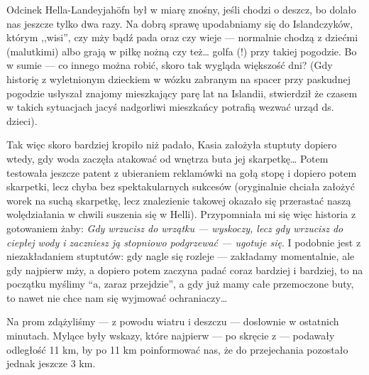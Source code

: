 

Odcinek Hella-Landeyjahöfn był w miarę znośny, jeśli chodzi o deszcz, bo dolało nas jeszcze tylko dwa razy. Na dobrą sprawę upodabniamy się do Islandczyków, którym ,,wisi'', czy mży bądź pada oraz czy wieje --- normalnie chodzą z dziećmi (malutkimi) albo grają w piłkę nożną czy też… golfa (!) przy takiej pogodzie. Bo w sumie --- co innego można robić, skoro tak wygląda większość dni? (Gdy historię z wyletnionym dzieckiem w wózku zabranym na spacer przy paskudnej pogodzie usłyszał znajomy mieszkający parę lat na Islandii, stwierdził że czasem w takich sytuacjach jacyś nadgorliwi mieszkańcy potrafią wezwać urząd ds. dzieci).

Tak więc skoro bardziej kropiło niż padało, Kasia założyła stuptuty dopiero wtedy, gdy woda zaczęła atakować od wnętrza buta jej skarpetkę… Potem testowała jeszcze patent z ubieraniem reklamówki na gołą stopę i dopiero potem skarpetki, lecz chyba bez spektakularnych sukcesów (oryginalnie chciała założyć worek na suchą skarpetkę, lecz znalezienie takowej okazało się przerastać naszą wolędziałania w chwili suszenia się w Helli). Przypomniała mi się więc historia z gotowaniem żaby: \emph{Gdy wrzucisz do wrzątku --- wyskoczy, lecz gdy wrzucisz do ciepłej wody i zaczniesz ją stopniowo podgrzewać --- ugotuje się}. I podobnie jest z niezakładaniem stuptutów: gdy nagle się rozleje --- zakładamy momentalnie, ale gdy najpierw mży, a dopiero potem zaczyna padać coraz bardziej i bardziej, to na początku myślimy “a, zaraz przejdzie”, a gdy już mamy całe przemoczone buty, to nawet nie chce nam się wyjmować ochraniaczy…

Na prom zdążyliśmy --- z powodu wiatru i deszczu --- dosłownie w ostatnich minutach. Mylące były wskazy, które najpierw --- po skręcie z  --- podawały odległość 11 km, by po 11 km poinformować nas, że do przejechania pozostało jednak jeszcze 3 km.

